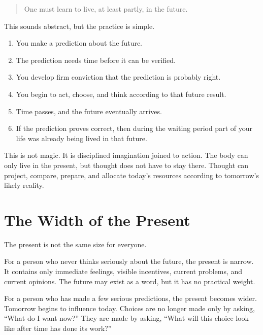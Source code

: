 \begin{quote}
One must learn to live, at least partly, in the future.
\end{quote}

This sounds abstract, but the practice is simple.

\begin{enumerate}
\item You make a prediction about the future.
\item The prediction needs time before it can be verified.
\item You develop firm conviction that the prediction is probably right.
\item You begin to act, choose, and think according to that future result.
\item Time passes, and the future eventually arrives.
\item If the prediction proves correct, then during the waiting period part of your life was already being lived in that future.
\end{enumerate}

This is not magic. It is disciplined imagination joined to action. The body can only live in the present, but thought does not have to stay there. Thought can project, compare, prepare, and allocate today's resources according to tomorrow's likely reality.

\section*{The Width of the Present}

The present is not the same size for everyone.

For a person who never thinks seriously about the future, the present is narrow. It contains only immediate feelings, visible incentives, current problems, and current opinions. The future may exist as a word, but it has no practical weight.

For a person who has made a few serious predictions, the present becomes wider. Tomorrow begins to influence today. Choices are no longer made only by asking, ``What do I want now?'' They are made by asking, ``What will this choice look like after time has done its work?''

